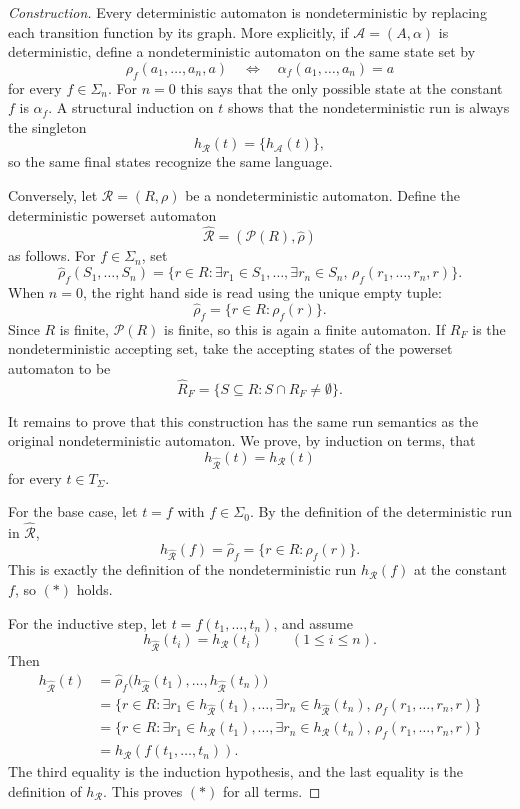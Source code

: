 \documentclass[11pt]{article}
\theoremstyle{definition}
\newcommand{\SigmaSym}{\Sigma}
\newcommand{\Term}[1]{T_{#1}}
\newcommand{\Aut}{\mathcal A}
\newcommand{\NAut}{\mathcal R}
\begin{document}
\begin{proof}[Construction]
Every deterministic automaton is nondeterministic by replacing each transition
function by its graph.  More explicitly, if \(\Aut=(A,\alpha)\) is deterministic,
define a nondeterministic automaton on the same state set by
\[
  \rho_f(a_1,\ldots,a_n,a)
  \quad\Longleftrightarrow\quad
  \alpha_f(a_1,\ldots,a_n)=a
\]
for every \(f\in\SigmaSym_n\).  For \(n=0\) this says that the only possible
state at the constant \(f\) is \(\alpha_f\).  A structural induction on \(t\)
shows that the nondeterministic run is always the singleton
\[
  h_\NAut(t)=\{h_\Aut(t)\},
\]
so the same final states recognize the same language.

Conversely, let \(\NAut=(R,\rho)\) be a nondeterministic automaton.  Define the
deterministic powerset automaton
\[
  \widehat{\NAut}=(\mathcal P(R),\widehat\rho)
\]
as follows.  For \(f\in\SigmaSym_n\), set
\[
  \widehat\rho_f(S_1,\ldots,S_n)
  =
  \{r\in R:\exists r_1\in S_1,\ldots,\exists r_n\in S_n,\,
      \rho_f(r_1,\ldots,r_n,r)\}.
\]
When \(n=0\), the right hand side is read using the unique empty tuple:
\[
  \widehat\rho_f
  =
  \{r\in R:\rho_f(r)\}.
\]
Since \(R\) is finite, \(\mathcal P(R)\) is finite, so this is again a finite
automaton.  If \(R_F\) is the nondeterministic accepting set, take the accepting
states of the powerset automaton to be
\[
  \widehat R_F=\{S\subseteq R:S\cap R_F\neq\emptyset\}.
\]

It remains to prove that this construction has the same run semantics as the
original nondeterministic automaton.  We prove, by induction on terms, that
\[
  h_{\widehat{\NAut}}(t)=h_\NAut(t)       \tag{\(*\)}
\]
for every \(t\in\Term{\SigmaSym}\).

For the base case, let \(t=f\) with \(f\in\SigmaSym_0\).  By the definition of
the deterministic run in \(\widehat{\NAut}\),
\[
  h_{\widehat{\NAut}}(f)=\widehat\rho_f
  =
  \{r\in R:\rho_f(r)\}.
\]
This is exactly the definition of the nondeterministic run \(h_\NAut(f)\) at the
constant \(f\), so \((*)\) holds.

For the inductive step, let \(t=f(t_1,\ldots,t_n)\), and assume
\[
  h_{\widehat{\NAut}}(t_i)=h_\NAut(t_i)
  \qquad (1\le i\le n).
\]
Then
\begin{align*}
  h_{\widehat{\NAut}}(t)
  &=
  \widehat\rho_f\bigl(h_{\widehat{\NAut}}(t_1),\ldots,
    h_{\widehat{\NAut}}(t_n)\bigr) \\
  &=
  \{r\in R:\exists r_1\in h_{\widehat{\NAut}}(t_1),\ldots,
      \exists r_n\in h_{\widehat{\NAut}}(t_n),\,
      \rho_f(r_1,\ldots,r_n,r)\} \\
  &=
  \{r\in R:\exists r_1\in h_\NAut(t_1),\ldots,
      \exists r_n\in h_\NAut(t_n),\,
      \rho_f(r_1,\ldots,r_n,r)\} \\
  &=
  h_\NAut(f(t_1,\ldots,t_n)).
\end{align*}
The third equality is the induction hypothesis, and the last equality is the
definition of \(h_\NAut\).  This proves \((*)\) for all terms.


\end{proof}
\end{document}
